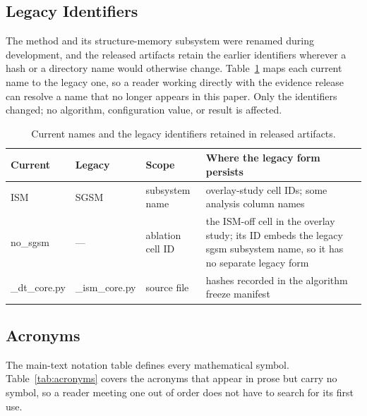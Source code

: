 \documentclass[algorithms,article,submit,moreauthors,pdftex]{Definitions/mdpi}
\begin{document}
\subsection{Legacy Identifiers}\label{sec:repro:aliases}

The method and its structure-memory subsystem were renamed during development,
and the released artifacts retain the earlier identifiers wherever a hash or a
directory name would otherwise change. Table~\ref{tab:aliases} maps each current
name to the legacy one, so a reader working directly with the evidence release
can resolve a name that no longer appears in this paper. Only the identifiers
changed; no algorithm, configuration value, or result is affected.

\begin{table}[H]
\caption{Current names and the legacy identifiers retained in released
artifacts.}
\label{tab:aliases}
\centering
\small
\begin{tabular}{lllp{4.4cm}}
\toprule
\textbf{Current} & \textbf{Legacy} & \textbf{Scope} & \textbf{Where the legacy form persists}\\
\midrule
ISM & SGSM & subsystem name & overlay-study cell IDs; some analysis column names\\
no\_sgsm & --- & ablation cell ID & the ISM-off cell in the overlay
study; its ID embeds the legacy sgsm subsystem name, so it has no
separate legacy form\\
\_dt\_core.py & \_ism\_core.py & source file & hashes recorded in the
algorithm freeze manifest\\
\bottomrule
\end{tabular}
\end{table}

\subsection{Acronyms}\label{sec:repro:acronyms}

The main-text notation table defines every mathematical symbol.
Table~\ref{tab:acronyms} covers the acronyms that appear in prose but carry no
symbol, so a reader meeting one out of order does not have to search for its
first use.
\end{document}
